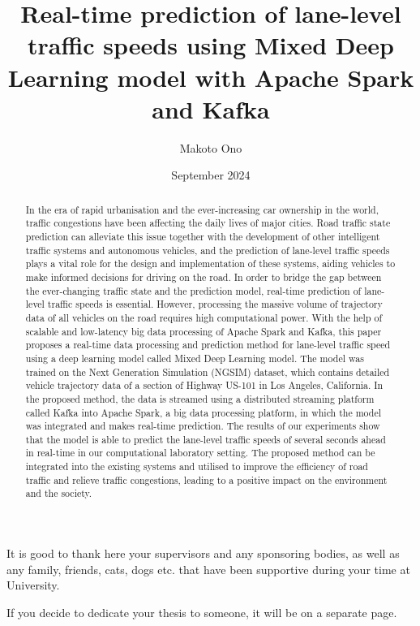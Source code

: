 \documentclass[11pt]{uonthesis}
\title{Real-time prediction of lane-level traffic speeds using Mixed Deep Learning model with Apache Spark and Kafka}
\author{Makoto Ono}
\date{September 2024}
\begin{document}
\begin{frontmatter}
\maketitle
\tableofcontents

\begin{abstract}
In the era of rapid urbanisation and the ever-increasing car ownership in the world, traffic congestions have been affecting the daily lives of major cities. Road traffic state prediction can alleviate this issue together with the development of other intelligent traffic systems and autonomous vehicles, and the prediction of lane-level traffic speeds plays a vital role for the design and implementation of these systems, aiding vehicles to make informed decisions for driving on the road. In order to bridge the gap between the ever-changing traffic state and the prediction model, real-time prediction of lane-level traffic speeds is essential. However, processing the massive volume of trajectory data of all vehicles on the road requires high computational power. With the help of scalable and low-latency big data processing of Apache Spark and Kafka, this paper proposes a real-time data processing and prediction method for lane-level traffic speed using a deep learning model called Mixed Deep Learning model. The model was trained on the Next Generation Simulation (NGSIM) dataset, which contains detailed vehicle trajectory data of a section of Highway US-101 in Los Angeles, California. In the proposed method, the data is streamed using a distributed streaming platform called Kafka into Apache Spark, a big data processing platform, in which the model was integrated and makes real-time prediction. The results of our experiments show that the model is able to predict the lane-level traffic speeds of several seconds ahead in real-time in our computational laboratory setting. The proposed method can be integrated into the existing systems and utilised to improve the efficiency of road traffic and relieve traffic congestions, leading to a positive impact on the environment and the society.
\end{abstract}

\begin{acknowledgements}
It is good to thank here your supervisors and any sponsoring bodies,
as well as any family, friends, cats, dogs etc. that have been
supportive during your time at University.
\end{acknowledgements}

\begin{dedication}
If you decide to dedicate your thesis to someone, it will be on a
separate page.
\end{dedication}

\end{frontmatter}
\end{document}
